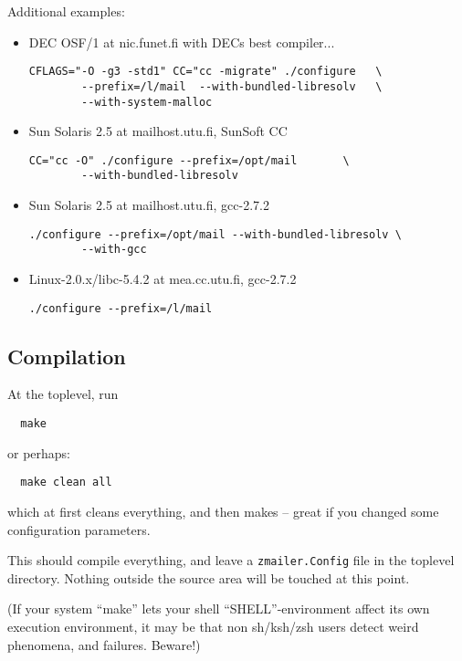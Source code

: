 Additional examples:
\begin{itemize}
\item DEC OSF/1 at nic.funet.fi with DECs best compiler...
\begin{verbatim}
CFLAGS="-O -g3 -std1" CC="cc -migrate" ./configure   \
        --prefix=/l/mail  --with-bundled-libresolv   \
        --with-system-malloc
\end{verbatim}

\item Sun Solaris 2.5  at mailhost.utu.fi, SunSoft CC 
\begin{verbatim}
CC="cc -O" ./configure --prefix=/opt/mail       \
        --with-bundled-libresolv
\end{verbatim}

\item Sun Solaris 2.5  at mailhost.utu.fi, gcc-2.7.2
\begin{verbatim}
./configure --prefix=/opt/mail --with-bundled-libresolv \
        --with-gcc
\end{verbatim}

\item Linux-2.0.x/libc-5.4.2 at mea.cc.utu.fi, gcc-2.7.2 
\begin{verbatim}
./configure --prefix=/l/mail
\end{verbatim}

\end{itemize}



\subsection{Compilation}

At the toplevel, run
\begin{verbatim}
  make
\end{verbatim}

or perhaps:
\begin{verbatim}
  make clean all
\end{verbatim}

which at first cleans everything, and then makes -- great if you
changed some configuration parameters.

This should compile everything, and leave a {\tt zmailer.Config} file in
the toplevel directory.  Nothing outside the source area will be
touched at this point.

(If your system ``make'' lets your shell ``SHELL''-environment
affect its own execution environment, it may be that non sh/ksh/zsh
users detect weird phenomena, and failures. Beware!)




